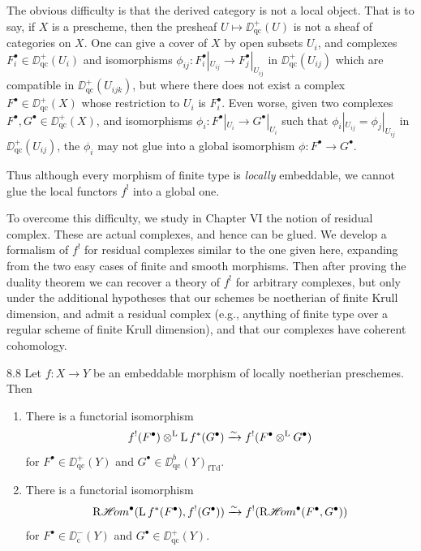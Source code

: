 The obvious difficulty is that the derived category is not a local object. That is to say, if $X$ is a prescheme, then the presheaf $U\mapsto\DD_{\mathrm{qc}}^+(U)$ is not a sheaf of categories on $X$. One can give a cover of $X$ by open subsets $U_i$, and complexes $F_i^\bullet\in\DD_{\mathrm{qc}}^+(U_i)$ and isomorphisms $\phi_{ij}\colon F_i^\bullet|_{U_{ij}}\to F_j^\bullet|_{U_{ij}}$ in $\DD_{\mathrm{qc}}^+(U_{ij})$ which are compatible in $\DD_{\mathrm{qc}}^+(U_{ijk})$, but where there does not exist a complex $F^\bullet\in\DD_{\mathrm{qc}}^+(X)$ whose restriction to $U_i$ is $F_i^\bullet$. Even worse, given two complexes $F^\bullet,G^\bullet\in\DD_{\mathrm{qc}}^+(X)$, and isomorphisms $\phi_i\colon F^\bullet|_{U_i}\to G^\bullet|_{U_i}$ such that $\phi_i|_{U_{ij}}=\phi_j|_{U_{ij}}$ in $\DD_{\mathrm{qc}}^+(U_{ij})$, the $\phi_i$ may not glue into a global isomorphism $\phi\colon F^\bullet\to G^\bullet$.

Thus although every morphism of finite type is \emph{locally} embeddable, we cannot glue the local functors $f^!$ into a global one.

To overcome this difficulty, we study in Chapter VI the notion of residual complex. These are actual complexes, and hence can be glued. We develop a formalism of $f^!$ for residual complexes similar to the one given here, expanding from the two easy cases of finite and smooth morphisms. Then after proving the duality theorem we can recover a theory of $f^!$ for arbitrary complexes, but only under the additional hypotheses that our schemes be noetherian of finite Krull dimension, and admit a residual complex (e.g., anything of finite type over a regular scheme of finite Krull dimension), and that our complexes have coherent cohomology.

\begin{bookproposition}{8.8}\label{prop:3.8.8}
Let $f\colon X\to Y$ be an embeddable morphism of locally noetherian preschemes. Then
\begin{enumerate}
\item[6)] There is a functorial isomorphism
\[
f^!(F^\bullet)\mathbin{\otimes^{\mathrm{L}}}\operatorname{L} f^*(G^\bullet) \xrightarrow{\sim} f^!(F^\bullet\mathbin{\otimes^{\mathrm{L}}} G^\bullet)
\]
for $F^\bullet\in\DD_{\mathrm{qc}}^+(Y)$ and $G^\bullet\in\DD_{\mathrm{qc}}^b(Y)_{\mathrm{fTd}}$.
\item[7)] There is a functorial isomorphism
\[
\mathop{\mathrm{R}\mathscr{H}\!om}\nolimits^\bullet(\operatorname{L} f^*(F^\bullet), f^!(G^\bullet)) \xrightarrow{\sim} f^!(\mathop{\mathrm{R}\mathscr{H}\!om}\nolimits^\bullet(F^\bullet,G^\bullet))
\]
for $F^\bullet\in\DD_{\mathrm{c}}^-(Y)$ and $G^\bullet\in\DD_{\mathrm{qc}}^+(Y)$.
\end{enumerate}
\end{bookproposition}

